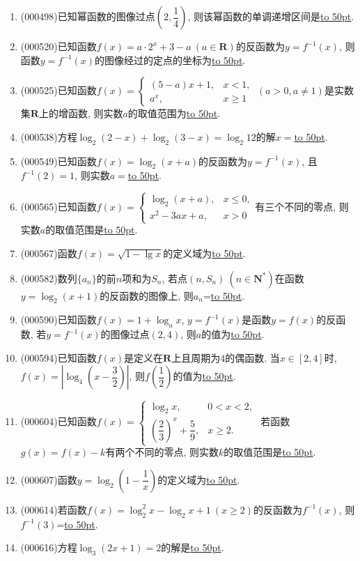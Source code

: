 \documentclass[10pt,a4paper]{article}
\newcommand{\blank}[1]{\underline{\hbox to #1pt{}}}
\begin{document}
\begin{enumerate}[1.]
\item {\tiny (000498)}已知幂函数的图像过点$(2,\dfrac14)$, 则该幂函数的单调递增区间是\blank{50}.
\item {\tiny (000520)}已知函数$f(x)=a\cdot 2^x+3-a\ (a\in \mathbf{R})$的反函数为$y=f^{-1}(x)$, 则函数$y=f^{-1}(x)$的图像经过的定点的坐标为\blank{50}.
\item {\tiny (000525)}已知函数$f(x)=\begin{cases} (5-a)x+1, & x<1, \\ a^x, & x\ge 1\end{cases} \ (a>0,a\ne 1)$是实数集$\mathbf{R}$上的增函数, 则实数$a$的取值范围为\blank{50}.
\item {\tiny (000538)}方程$\log_2(2-x)+\log_2(3-x)=\log_2 12$的解$x=$\blank{50}.
\item {\tiny (000549)}已知函数$f(x)=\log_2(x+a)$的反函数为$y=f^{-1}(x)$, 且$f^{-1}(2)=1$, 则实数$a=$\blank{50}.
\item {\tiny (000565)}已知函数$f(x)=\begin{cases} \log_2 (x+a), & x\le 0, \\ x^2-3ax+a, & x>0 \end{cases}$有三个不同的零点, 则实数$a$的取值范围是\blank{50}.
\item {\tiny (000567)}函数$f(x)=\sqrt{1-\lg x}$的定义域为\blank{50}.
\item {\tiny (000582)}数列$\{a_n\}$的前$n$项和为$S_n$, 若点$(n,S_n) \ (n\in \mathbf{N}^*)$在函数$y=\log_2 (x+1)$的反函数的图像上, 则$a_n$=\blank{50}.
\item {\tiny (000590)}已知函数$f(x)=1+\log_a x$, $y=f^{-1}(x)$是函数$y=f(x)$的反函数, 若$y=f^{-1}(x)$的图像过点$(2,4)$, 则$a$的值为\blank{50}.
\item {\tiny (000594)}已知函数$f(x)$是定义在$\mathbf{R}$上且周期为$4$的偶函数. 当$x\in [2,4]$时, $f(x)=\left|\log_4(x-\dfrac32)\right|$, 则$f(\dfrac12)$的值为\blank{50}.
\item {\tiny (000604)}已知函数$f(x)=\begin{cases} \log_2 x, & 0<x<2, \\ (\dfrac23)^x+\dfrac59, & x\ge 2. \end{cases}$ 若函数$g(x)=f(x)-k$有两个不同的零点, 则实数$k$的取值范围是\blank{50}.
\item {\tiny (000607)}函数$y=\log_2(1-\dfrac1x)$的定义域为\blank{50}.
\item {\tiny (000614)}若函数$f(x)=\log_2^2x-\log_2 x+1 \ (x\ge 2)$的反函数为$f^{-1}(x)$, 则$f^{-1}(3)$=\blank{50}.
\item {\tiny (000616)}方程$\log_3(2x+1)=2$的解是\blank{50}.

\end{enumerate}
\end{document}
